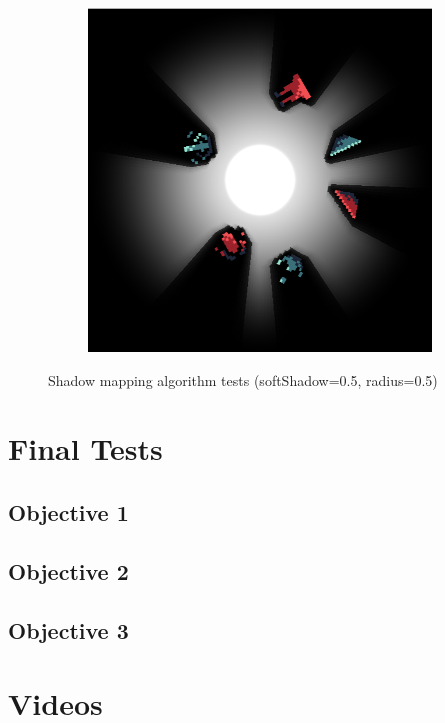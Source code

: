 \documentclass[../main/main.tex]{subfiles}
\begin{document}
\begin{figure}[H]
\begin{subfigure}[b]{0.3\columnwidth}
    \end{subfigure}
    \begin{subfigure}[b]{0.3\columnwidth}
    \includegraphics[width=\columnwidth]{../testing/assets/rays_example_3.png}
    \end{subfigure}

    \caption{Shadow mapping algorithm tests (softShadow=0.5, radius=0.5)}
    \label{fig:rays-examples}
\end{figure}

\section{Final Tests}
\subsection{Objective 1}
\subsection{Objective 2}
\subsection{Objective 3}

\section{Videos}
\end{document}
